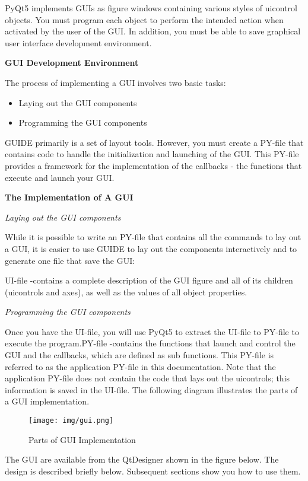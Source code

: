 \documentclass[journal, twocolumn]{IEEEtran}
\begin{document}
PyQt5 implements GUIs as figure windows containing various styles of uicontrol objects. You must program each object to perform the intended action when activated by the user of the GUI. In addition, you must be able to save graphical user interface development environment.

\textbf{GUI Development Environment}

The process of implementing a GUI involves two basic tasks:
\begin{itemize}
	\item Laying out the GUI components 
	\item Programming the GUI components
\end{itemize}
GUIDE primarily is a set of layout tools. However, you must create a PY-file that contains code to handle the initialization and launching of the GUI. This PY-file provides a framework for the implementation of the callbacks - the functions that execute and launch your GUI. 

\textbf{The Implementation of A GUI}

\textit{Laying out the GUI components}

While it is possible to write an PY-file that contains all the commands to lay out a GUI, it is easier to use GUIDE to lay out the components interactively and to generate one file that save the GUI:

UI-file -contains a complete description of the GUI figure and all of its children (uicontrols and axes), as well as the values of all object properties.

\textit{Programming the GUI components} 

Once you have the UI-file, you will use PyQt5 to extract the UI-file to PY-file to execute the program.PY-file -contains the functions that launch and control the GUI and the callbacks, which are defined as sub functions. This PY-file is referred to as the application PY-file in this documentation. Note that the application PY-file does not contain the code that lays out the uicontrols; this information is saved in the UI-file. The following diagram illustrates the parts of a GUI implementation.

\begin{figure}[!h]
	\centering
	\texttt{[image: img/gui.png]}
	\caption{Parts of GUI Implementation}\label{fig:gui}
\end{figure}

The GUI are available from the QtDesigner shown in the figure below. The design is described briefly below. Subsequent sections show you how to use them.
\end{document}
